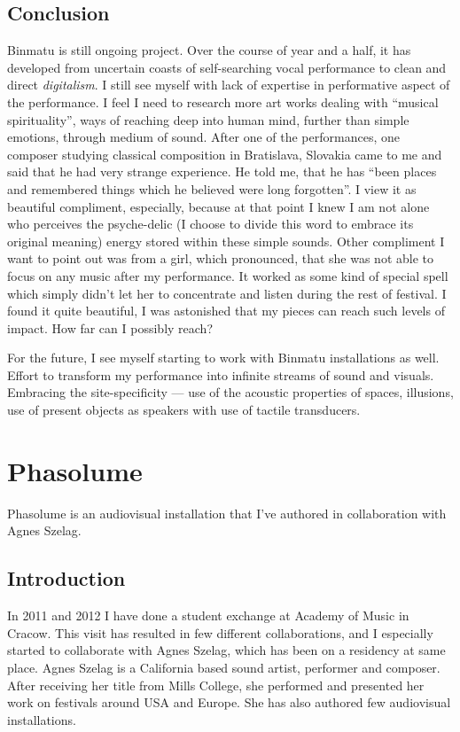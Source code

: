 \documentclass[12pt,a4paper,oneside]{report}
\begin{document}
\subsection{Conclusion} Binmatu is still ongoing project. Over the course of year and a half, it has developed from uncertain coasts of self-searching vocal performance to clean and direct \emph{digitalism}. I still see myself with lack of expertise in performative aspect of the performance. I feel I need to research more art works dealing with ``musical spirituality'', ways of reaching deep into human mind, further than simple emotions, through medium of sound. After one of the performances, one composer studying classical composition in Bratislava, Slovakia came to me and said that he had very strange experience. He told me, that he has ``been places and remembered things which he believed were long forgotten''. I view it as beautiful compliment, especially, because at that point I knew I am not alone who perceives the psyche-delic (I choose to divide this word to embrace its original meaning) energy stored within these simple sounds. Other compliment I want to point out was from a girl, which pronounced, that she was not able to focus on any music after my performance. It worked as some kind of special spell which simply didn't let her to concentrate and listen during the rest of festival. I found it quite beautiful, I was astonished that my pieces can reach such levels of impact. How far can I possibly reach?

For the future, I see myself starting to work with Binmatu installations as well. Effort to transform my performance into infinite streams of sound and visuals. Embracing the site-specificity --- use of the acoustic properties of spaces, illusions, use of present objects as speakers with use of tactile transducers.

\clearpage
\section{Phasolume} Phasolume is an audiovisual installation that I've authored in collaboration with Agnes Szelag.

\subsection{Introduction} In 2011 and 2012 I have done a student exchange at Academy of Music in Cracow. This visit has resulted in few different collaborations, and I especially started to collaborate with Agnes Szelag, which has been on a residency at same place. Agnes Szelag is a California based sound artist, performer and composer. After receiving her title from Mills College, she performed and presented her work on festivals around USA and Europe. She has also authored few audiovisual installations. 
\end{document}
